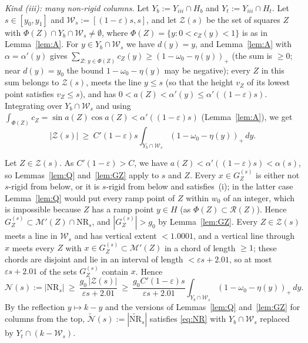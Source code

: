 \documentclass[11pt]{amsart}
\theoremstyle{definition}
\theoremstyle{remark}
\begin{document}
\smallskip\noindent\emph{Kind (iii): many non-rigid columns.}
Let $Y_b:=Y_{iii}\cap H_b$ and $Y_t:=Y_{iii}\cap H_t$. Let $s\in[y_0,y_1]$ and $\mathcal W_s:=[(1-\varepsilon)s,s]$, and let $\mathcal Z(s)$
be the set of squares $Z$ with $\Phi(Z)\cap Y_b\cap\mathcal W_s\ne\emptyset$, where $\Phi(Z)=\{y:0<c_Z(y)<1\}$ is as in
Lemma~\ref{lem:A}. For $y\in Y_b\cap\mathcal W_s$ we have $d(y)=y$, and Lemma~\ref{lem:A} with $\alpha=\alpha'(y)$ gives
$\sum_{Z:\,y\in\Phi(Z)}c_Z(y)\ge(1-\omega_0-\eta(y))_+$ (the sum is $\ge0$; near $d(y)=y_0$ the bound $1-\omega_0-\eta(y)$ may be negative); every $Z$ in this sum belongs to $\mathcal Z(s)$, meets the line $y\le s$ (so that the height
$v_Z$ of its lowest point satisfies $v_Z\le s$), and has $0<a(Z)<\alpha'(y)\le\alpha'((1-\varepsilon)s)$. Integrating over $Y_b\cap\mathcal W_s$ and
using $\int_{\Phi(Z)}c_Z=\sin a(Z)\cos a(Z)<\alpha'((1-\varepsilon)s)$ (Lemma~\ref{lem:A}), we get
\[
|\mathcal Z(s)|\ \ge\ C'(1-\varepsilon)s\int_{Y_b\cap\mathcal W_s}(1-\omega_0-\eta(y))_+\,dy .
\]

Let $Z\in\mathcal Z(s)$. As $C'(1-\varepsilon)>C$, we have $a(Z)<\alpha'((1-\varepsilon)s)<\alpha(s)$, so Lemmas~\ref{lem:Q} and~\ref{lem:GZ}
apply to $s$ and $Z$. Every $x\in G_Z^{(s)}$ is either not $s$-rigid from below, or it is $s$-rigid from below and satisfies~(i);
in the latter case Lemma~\ref{lem:Q} would put every ramp point of $Z$ within $w_0$ of an integer, which is impossible because
$Z$ has a ramp point $y\in H$ (as $\Phi(Z)\subset\mathcal R(Z)$). Hence $G_Z^{(s)}\subset\mathcal M'(Z)\cap\mathrm{NR}_s$, and
$|G_Z^{(s)}|>g_0$ by Lemma~\ref{lem:GZ}. Every $Z\in\mathcal Z(s)$ meets a line in $\mathcal W_s$ and has vertical extent
$<1.0001$, and a vertical line through $x$ meets every $Z$ with $x\in G_Z^{(s)}\subset\mathcal M'(Z)$ in a chord of length $\ge1$; these
chords are disjoint and lie in an interval of length $<\varepsilon s+2.01$, so at most $\varepsilon s+2.01$ of the sets $G_Z^{(s)}$ contain
$x$. Hence
\begin{equation}\label{eq:NR}
\mathcal N(s):=|\mathrm{NR}_s|\ \ge\ \frac{g_0\,|\mathcal Z(s)|}{\varepsilon s+2.01}\ \ge\ \frac{g_0C'(1-\varepsilon)s}{\varepsilon s+2.01}
\int_{Y_b\cap\mathcal W_s}(1-\omega_0-\eta(y))_+\,dy .
\end{equation}
By the reflection $y\mapsto k-y$ and the versions of Lemmas~\ref{lem:Q} and~\ref{lem:GZ} for columns from the top,
$\widetilde{\mathcal N}(s):=|\widetilde{\mathrm{NR}}_s|$ satisfies \eqref{eq:NR} with $Y_b\cap\mathcal W_s$ replaced by $Y_t\cap(k-\mathcal W_s)$.
\end{document}
